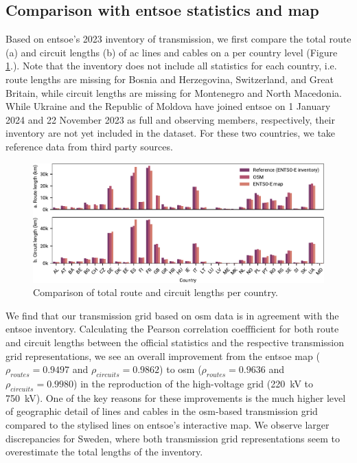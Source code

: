 \documentclass[fleqn,10pt]{wlscirep}
\let\autocite\cite
\begin{document}
\subsection*{Comparison with \acrshort{entsoe} statistics and map}
Based on \acrshort{entsoe}'s 2023 inventory of transmission,\autocite{entso-eInventoryTransmission20232024} we first compare the total route (a) and circuit lengths (b) of \acrshort{ac} lines and cables on a per country level (Figure \ref{fig:bar_lengths}.). Note that the inventory does not include all statistics for each country, i.e. route lengths are missing for Bosnia and Herzegovina, Switzerland, and Great Britain, while circuit lengths are missing for Montenegro and North Macedonia. While Ukraine and the Republic of Moldova have joined \acrshort{entsoe} on 1 January 2024 and 22 November 2023 as full and observing members, respectively, their inventory are not yet included in the dataset. For these two countries, we take reference data from third party sources.\autocite{cigrePowerSystemUkraine2018,globaldataTopFiveTransmission2023,moldelectricaTechnicalEconomicIndicators2023}

\begin{figure}[!htbp]
    \centering
    \includegraphics{figures/fig_bar_lengths.pdf}
    \caption{Comparison of total route and circuit lengths per country.}
    \label{fig:bar_lengths}
\end{figure}

We find that our transmission grid based on \gls{osm} data is in agreement with the \acrshort{entsoe} inventory. Calculating the Pearson correlation coeffficient for both route and circuit lengths between the official statistics and the respective transmission grid representations, we see an overall improvement from the \acrshort{entsoe} map ($\rho_{routes} = 0.9497$ and $\rho_{circuits} = 0.9862$) to \gls{osm} ($\rho_{routes} = 0.9636$ and $\rho_{circuits} = 0.9980$) in the reproduction of the high-voltage grid (\SI{220}{\kilo\volt} to \SI{750}{\kilo\volt}). One of the key reasons for these improvements is the much higher level of geographic detail of lines and cables in the \gls{osm}-based transmission grid compared to the stylised lines on \acrshort{entsoe}'s interactive map. We observe larger discrepancies for Sweden, where both transmission grid representations seem to overestimate the total lengths of the inventory.
\end{document}
